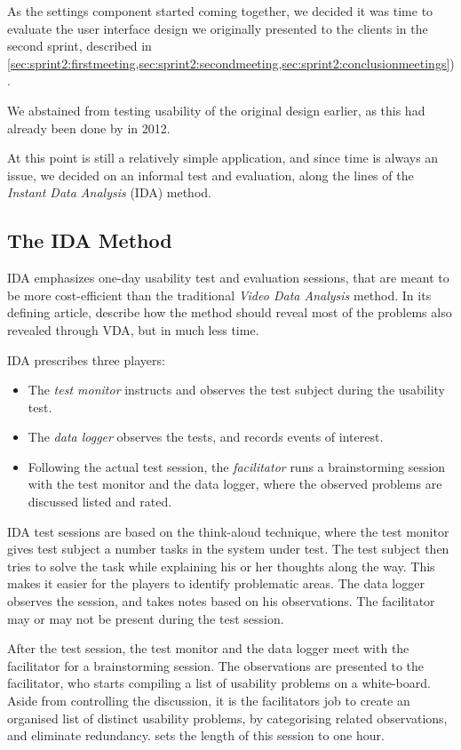 As the settings component started coming together, we decided it was time to evaluate the user interface design we originally presented to the clients in the second sprint, described in \cref{sec:sprint2:firstmeeting,sec:sprint2:secondmeeting,sec:sprint2:conclusionmeetings}).

We abstained from testing usability of the original \launcher design earlier, as this had already been done by \citet{launcher2012} in 2012.

At this point \launcher is still a relatively simple application, and since time is always an issue, we decided on an informal test and evaluation, along the lines of the \textit{Instant Data Analysis} (IDA) method. 

\subsection{The IDA Method}
IDA emphasizes one-day usability test and evaluation sessions, that are meant to be more cost-efficient than the traditional \textit{Video Data Analysis} method. In its defining article, \citet{idaArticle} describe how the method should reveal most of the problems also revealed through VDA, but in much less time. 

IDA prescribes three players: 
\begin{itemize}
	\item The \textit{test monitor} instructs and observes the test subject during the usability test.
	\item The \textit{data logger} observes the tests, and records events of interest.
	\item Following the actual test session, the \textit{facilitator} runs a brainstorming session with the test monitor and the data logger, where the observed problems are discussed listed and rated. 
\end{itemize}

IDA test sessions are based on the think-aloud technique, where the test monitor gives test subject a number tasks in the system under test. The test subject then tries to solve the task while explaining his or her thoughts along the way. This makes it easier for the players to identify problematic areas. The data logger observes the session, and takes notes based on his observations. The facilitator may or may not be present during the test session.

After the test session, the test monitor and the data logger meet with the facilitator for a brainstorming session. The observations are presented to the facilitator, who starts compiling a list of usability problems on a white-board. Aside from controlling the discussion, it is the facilitators job to create an organised list of distinct usability problems, by categorising related observations, and eliminate redundancy. \citet{idaArticle} sets the length of this session to one hour. 

